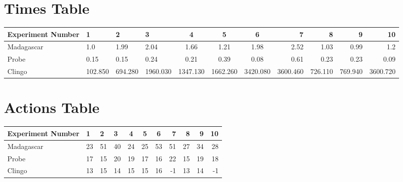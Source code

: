 \documentclass[8pt]{article}
\begin{document}
\begin{landscape}
\section{Times Table}\begin{tabular}{ | l | l | l | l | c | c | c | r | r | r | r | }\hline
Experiment Number & 1 & 2 & 3 & 4 & 5 & 6 & 7 & 8 & 9 & 10\\  \hline
Madagascar & 1.0 & 1.99 & 2.04 & 1.66 & 1.21 & 1.98 & 2.52 & 1.03 & 0.99 & 1.2\\  \hline
Probe & 0.15 & 0.15 & 0.24 & 0.21 & 0.39 & 0.08 & 0.61 & 0.23 & 0.23 & 0.09\\  \hline
Clingo & 102.850 & 694.280 & 1960.030 & 1347.130 & 1662.260 & 3420.080 & 3600.460 & 726.110 & 769.940 & 3600.720\\  \hline
\end{tabular}
\section{Actions Table}\begin{tabular}{ | l | l | l | l | c | c | c | r | r | r | r | }\hline
Experiment Number & 1 & 2 & 3 & 4 & 5 & 6 & 7 & 8 & 9 & 10\\ \hline
 Madagascar & 23 & 51 & 40 & 24 & 25 & 53 & 51 & 27 & 34 & 28\\ \hline
 Probe & 17 & 15 & 20 & 19 & 17 & 16 & 22 & 15 & 19 & 18\\ \hline
 Clingo & 13 & 15 & 14 & 15 & 15 & 16 & -1 & 13 & 14 & -1\\ \hline
\end{tabular}
\end{landscape}
\end{document}
